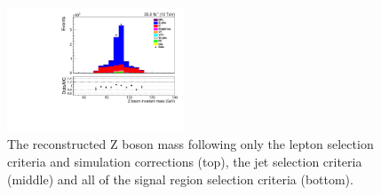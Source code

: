 \begin{figure}[h]
\includegraphics[width=0.47\textwidth]{figs/background-estimation/plots/unblinded/prompt_mumu_ttbarInc/zPairMass_NPL_mumu_wMass_mumu.pdf}
\caption{
The reconstructed Z boson mass following only the lepton selection criteria and simulation corrections (top), the jet selection criteria (middle) and all of the signal region selection criteria (bottom).
}
\label{fig:SR_zBosonMass}
\end{figure}

